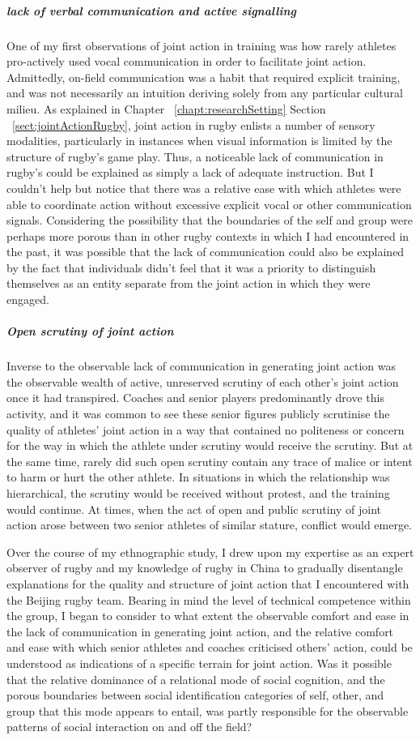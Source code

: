 \begin{CJK}{UTF8}{gbsn}
\subparagraph{lack of verbal communication and active signalling}
One of my first observations of joint action in training was how rarely athletes pro-actively used vocal communication in order to facilitate joint action.  Admittedly, on-field communication was a habit that required explicit training, and was not necessarily an intuition deriving solely from any particular cultural milieu.  As explained in Chapter ~\ref{chapt:researchSetting} Section ~\ref{sect:jointActionRugby}, joint action in rugby enlists a number of sensory modalities, particularly in instances when visual information is limited by the structure of rugby's game play.  Thus, a noticeable lack of communication in rugby's could be explained as simply a lack of adequate instruction.  But I couldn't help but notice that there was a relative ease with which athletes were able to coordinate action without excessive explicit vocal or other communication signals.  Considering the possibility that the boundaries of the self and group were perhaps more porous than in other rugby contexts in which I had encountered in the past, it was possible that the lack of communication could also be explained by the fact that individuals didn't feel that it was a priority to distinguish themselves as an entity separate from the joint action in which they were engaged.

\subparagraph{Open scrutiny of joint action \label{sect:openScrutiny}}
Inverse to the observable lack of communication in generating joint action was the observable wealth of active, unreserved scrutiny of each other's joint action once it had transpired.  Coaches and senior players predominantly drove this activity, and it was common to see these senior figures publicly scrutinise the quality of athletes' joint action in a way that contained no politeness or concern for the way in which the athlete under scrutiny would receive the scrutiny. But at the same time, rarely did such open scrutiny contain any trace of malice or intent to harm or hurt the other athlete. In situations in which the relationship was hierarchical, the scrutiny would be received without protest, and the training would continue.   At times, when the act of open and public scrutiny of joint action arose between two senior athletes of similar stature, conflict would emerge.

Over the course of my ethnographic study, I drew upon my expertise as an expert observer of rugby and my knowledge of rugby in China to  gradually disentangle explanations for the quality and structure of joint action that I encountered with the Beijing rugby team. Bearing in mind the level of technical competence within the group, I began to consider to what extent the observable comfort and ease in the lack of communication in generating joint action, and the relative comfort and ease with which senior athletes and coaches criticised others' action, could be understood as indications of a specific terrain for joint action.  Was it possible that the relative dominance of a relational mode of social cognition, and the porous boundaries between social identification categories of self, other, and group that this mode appears to entail, was partly responsible for the observable patterns of social interaction on and off the field?


\end{CJK}
